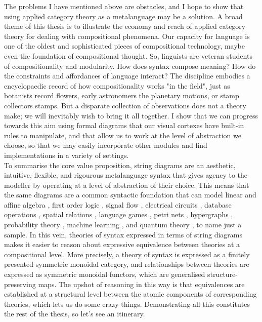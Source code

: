 The problems I have mentioned above are obstacles, and I hope to show that using applied category theory as a metalanguage may be a solution. A broad theme of this thesis is to illustrate the economy and reach of applied category theory for dealing with compositional phenomena. Our capacity for language is one of the oldest and sophisticated pieces of compositional technology, maybe even the foundation of compositional thought. So, linguists are veteran students of compositionality and modularity. How does syntax compose meaning? How do the constraints and affordances of language interact? The discipline embodies a encyclopaedic record of how compositionality works "in the field", just as botanists record flowers, early astronomers the planetary motions, or stamp collectors stamps. But a disparate collection of observations does not a theory make; we will inevitably wish to bring it all together. I show that we can progress towards this aim using formal diagrams that our visual cortexes have built-in rules to manipulate, and that allow us to work at the level of abstraction we choose, so that we may easily incorporate other modules and find implementations in a variety of settings.\\

To summarise the core value proposition, string diagrams are an aesthetic, intuitive, flexible, and rigourous metalanguage syntax that gives agency to the modeller by operating at a level of abstraction of their choice. This means that the same diagrams are a common syntactic foundation that can model linear and affine algebra \citep{}, first order logic \citep{}, signal flow \citep{}, electrical circuits \citep{}, database operations \citep{}, spatial relations \citep{}, language games \citep{}, petri nets \citep{}, hypergraphs \citep{}, probability theory \citep{}, machine learning \citep{}, and quantum theory \citep{}, to name just a sample. In this vein, theories of syntax expressed in terms of string diagrams makes it easier to reason about expressive equivalence between theories at a compositional level. More precisely, a theory of syntax is expressed as a finitely presented symmetric monoidal category, and relationships between theories are expressed as symmetric monoidal functors, which are generalised structure-preserving maps. The upshot of reasoning in this way is that equivalences are established at a structural level between the atomic components of corresponding theories, which lets us do some crazy things. Demonstrating all this constitutes the rest of the thesis, so let's see an itinerary.

